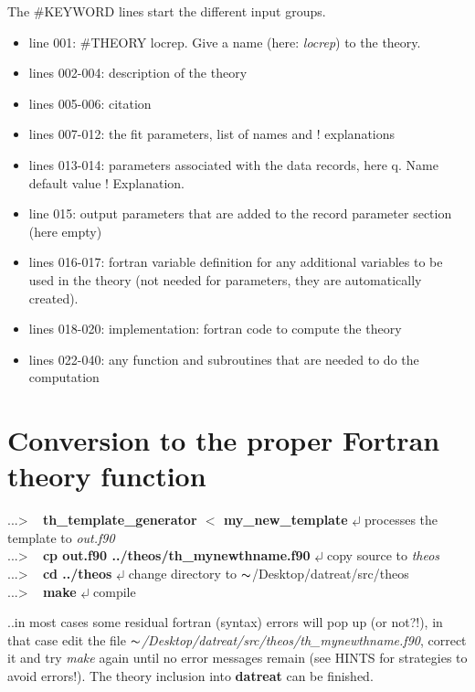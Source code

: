 \documentclass[11pt,fleqn]{book} %
\newcommand{\return}{$\carriagereturn$} %
\newcommand{\sysprompt}{{\color{green}...\textgreater} ~ }
\newcommand{\home}{${\thicksim}$/Desktop}
\newcommand{\enter}[1]{{\color{red} \bf #1}}
\newcommand{\expl}[1]{\hskip 0.5cm {\color{explgray} #1}}
\begin{document}
The \#KEYWORD lines start the different input groups.

\begin{itemize}
\item line 001:  \#THEORY locrep. Give a name (here: \emph{locrep}) to the theory.
\item lines 002-004: description of the theory
\item lines 005-006: citation 
\item lines 007-012: the fit parameters, list of names  and ! explanations
\item lines 013-014: parameters associated with the data records, here q. Name default value ! Explanation.
\item line 015: output parameters that are added to the record parameter section (here empty)
\item lines 016-017: fortran variable definition for any additional variables to be used in the theory
       (not needed for parameters, they are automatically created).
\item lines 018-020: implementation: fortran code to compute the theory
\item lines 022-040: any function and subroutines that are needed to do the computation

\end{itemize}

\section{Conversion to the proper Fortran theory function} 
\label{sec:finish}

\begin{corollary}
\sysprompt {\bf th\_template\_generator $<$ my\_new\_template} \return  \expl{processes the template to \emph{out.f90}}\\
\sysprompt {\bf cp out.f90 ../theos/th\_mynewthname.f90} \return  \expl{copy source to \emph{theos}}\\ 
\sysprompt {\bf cd ../theos} \return  \expl{change directory to \home/datreat/src/theos} \\
\sysprompt {\bf make} \return  \expl{compile} 
\end{corollary}
..in most cases some residual fortran (syntax) errors will pop up (or not?!), in that case
edit the file  {\it \home/datreat/src/theos/th\_mynewthname.f90}, correct it and try
\emph{make} again until no error messages remain (see HINTS for strategies to avoid errors!).
The theory inclusion into {\bf datreat} can be finished.
\end{document}
